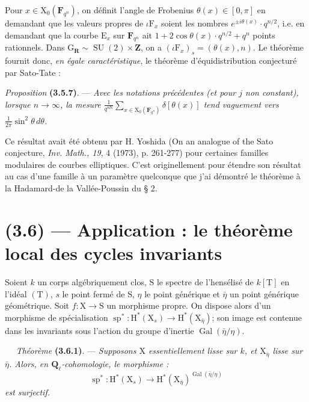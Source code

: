 \documentclass[11pt,leqno]{article}
\newcommand{\Page}[1]{\ifvmode\noindent\else\unskip\ \fi{\footnotesize\textcolor{gray}{[p.\,#1]}}\ \ignorespaces}
\begin{document}
Pour \(x\in\mathrm X_0(\mathbf F_{q^n})\), on définit l’angle de Frobenius \(\theta(x)\in[0,\pi]\) en demandant que les valeurs propres de \(\iota\mathrm F_x\) soient les nombres \(e^{\pm i\theta(x)}\cdot q^{n/2}\), i.e. en demandant que la courbe \(\mathrm E_x\) sur \(\mathbf F_{q^n}\) ait \(1+2\cos\theta(x)\cdot q^{n/2}+q^n\) points rationnels. Dans \(\mathrm G_{\mathbf R}\sim\operatorname{SU}(2)\times\mathbf Z\), on a \((\iota\mathrm F_x)_s=(\theta(x),n)\). Le théorème fournit donc, \textit{en égale caractéristique}, le théorème d’équidistribution conjecturé par Sato-Tate :

\textit{Proposition} \textbf{(3.5.7)}. — \textit{Avec les notations précédentes (et pour \(j\) non constant), lorsque \(n\to\infty\), la mesure \(\displaystyle\frac{1}{q^{n\mathrm N}}\sum_{x\in\mathrm X_0(\mathbf F_{q^n})}\delta[\theta(x)]\) tend vaguement vers \(\displaystyle\frac{1}{2\pi}\sin^2\theta\,d\theta\).}

Ce résultat avait été obtenu par H. Yoshida (On an analogue of the Sato conjecture, \textit{Inv. Math., 19}, 4 (1973), p. 261-277) pour certaines familles modulaires de courbes elliptiques. C’est originellement pour étendre son résultat au cas d’une famille à un paramètre quelconque que j’ai démontré le théorème à la Hadamard-de la Vallée-Poussin du § 2.

\section*{(3.6) — Application : le théorème local des cycles invariants}

Soient \(k\) un corps algébriquement clos, \(\mathrm S\) le spectre de l’hensélisé de \(k[\mathrm T]\) en l’idéal \((\mathrm T)\), \(s\) le point fermé de \(\mathrm S\), \(\eta\) le point générique et \(\bar\eta\) un point générique géométrique. Soit \(f:\mathrm X\to\mathrm S\) un morphisme propre. On dispose alors d’un morphisme de spécialisation \(\operatorname{sp}^*:\mathrm H^*(\mathrm X_s)\to\mathrm H^*(\mathrm X_{\bar\eta})\); son image est contenue dans les invariants sous l’action du groupe d’inertie \(\operatorname{Gal}(\bar\eta/\eta)\).

\Page{213}
\textit{Théorème} \textbf{(3.6.1)}. — \textit{Supposons \(\mathrm X\) essentiellement lisse sur \(k\), et \(\mathrm X_{\bar\eta}\) lisse sur \(\bar\eta\). Alors, en \(\mathbf Q_\ell\)-cohomologie, le morphisme :}
\[
\operatorname{sp}^*:\mathrm H^*(\mathrm X_s)\to
\mathrm H^*(\mathrm X_{\bar\eta})^{\operatorname{Gal}(\bar\eta/\eta)}
\]
\textit{est surjectif.}
\end{document}

